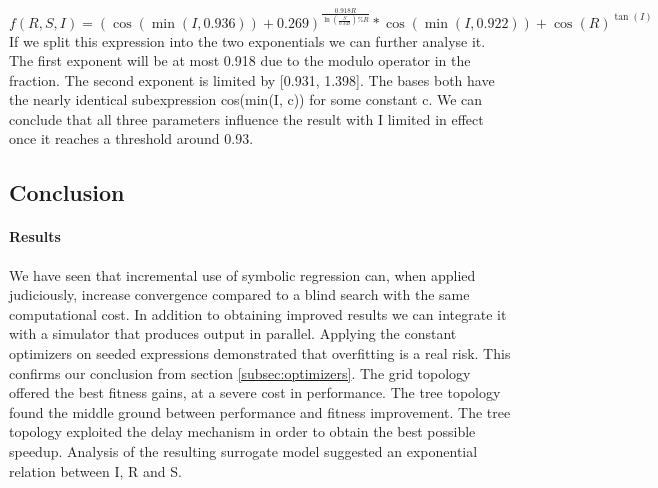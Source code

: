 \[
f(R, S, I) = ({\cos(\min(I,0.936))}+{0.269}) ^ {\frac{0.918 R}{{\ln(\frac{S}{0.349})}\%{R}}} * {\cos(\min(I, 0.922))+{\cos(R)} ^ {\tan(I)} }
\]
If we split this expression into the two exponentials we can further analyse it. The first exponent will be at most 0.918 due to the modulo operator in the fraction. The second exponent is limited by [0.931, 1.398]. The bases both have the nearly identical subexpression cos(min(I, c)) for some constant c. We can conclude that all three parameters influence the result with I limited in effect  once it reaches a threshold around 0.93. 
\subsection{Conclusion}
\paragraph{Results}
We have seen that incremental use of symbolic regression can, when applied judiciously, increase convergence compared to a blind search with the same computational cost. In addition to obtaining improved results we can integrate it with a simulator that produces output in parallel. 
Applying the constant optimizers on seeded expressions demonstrated that overfitting is a real risk. This confirms our conclusion from section \ref{subsec:optimizers}.
The grid topology offered the best fitness gains, at a severe cost in performance. The tree topology found the middle ground between performance and fitness improvement. The tree topology exploited the delay mechanism in order to obtain the best possible speedup.
Analysis of the resulting surrogate model suggested an exponential relation between I, R and S.

